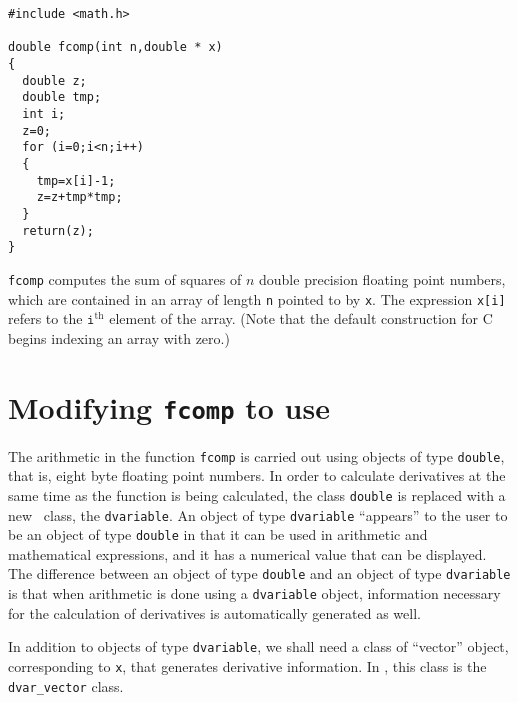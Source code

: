 \documentclass{admbmanual}
\begin{document}
\begin{lstlisting}
#include <math.h>

double fcomp(int n,double * x)
{
  double z;
  double tmp;
  int i;
  z=0;
  for (i=0;i<n;i++)
  {
    tmp=x[i]-1;
    z=z+tmp*tmp;
  }
  return(z);
}
\end{lstlisting}
\texttt{fcomp} computes the sum of squares of $n$ double precision floating
point numbers, which are contained in an array of length \texttt{n} pointed to
by \texttt{x}. The expression \texttt{x[i]} refers to the
$\texttt{i}^\textrm{th}$ element of the array. (Note that the default
construction for C begins indexing an array with zero.)

\section{Modifying \texttt{fcomp} to use \scAD}

The arithmetic in the function \texttt{fcomp} is carried out using objects of
type \texttt{double}, that is, eight byte floating point numbers. In order to
calculate derivatives at the same time as the function is being calculated, the
class \texttt{double} is replaced with a new \scAD\ class, the
\texttt{dvariable}. An object of type \texttt{dvariable} ``appears'' to the user
to be an object of type \texttt{double} in that it can be used in arithmetic and
mathematical expressions, and it has a numerical value that can be displayed.
The difference between an object of type \texttt{double} and an object of type
\texttt{dvariable} is that when arithmetic is done using a \texttt{dvariable}
object, information necessary for the calculation of derivatives is
automatically generated as well.

In addition to objects of type \texttt{dvariable}, we shall need a class of
``vector'' object, corresponding to \texttt{x}, that generates derivative
information. In \scAD, this class is the \texttt{dvar\_vector} class.
\end{document}
